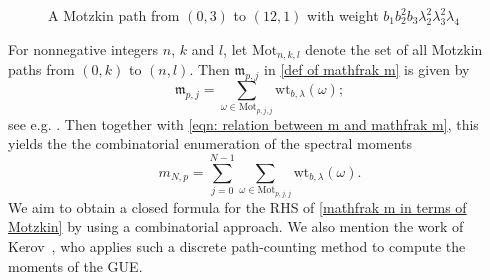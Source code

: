\documentclass{amsart}
\theoremstyle{plain}
\theoremstyle{remark}
\numberwithin{equation}{section}
\begin{document}
\begin{figure}[h]
\centering
{}
\caption{A Motzkin path from $(0,3)$ to $(12,1)$ with weight $b_{1}b_{2}^{2}b_{3}\lambda_{2}^{2}\lambda_{3}^{2}\lambda_{4}$} \label{Fig_Motzkin}
\end{figure}

For nonnegative integers $n$, $k$ and $l$, let $\mathrm{Mot}_{n,k,l}$ denote the set of all Motzkin paths from $(0,k)$ to $(n,l)$. 
Then  $\mathfrak{m}_{p,j}$ in \eqref{def of mathfrak m} is given by  
\begin{equation} \label{mathfrak m in terms of Motzkin}
   \mathfrak{m}_{p,j}=\sum_{\omega\in \mathrm{Mot}_{p,j,j}}\mathrm{wt}_{b,\lambda}(\omega);
\end{equation}
see e.g. \cite[Proposition 3.2]{BFO24}. 
Then together with \eqref{eqn: relation between m and mathfrak m}, this yields the  the combinatorial enumeration of the spectral moments
\begin{equation}\label{Flajolet Viennot}
    m_{N,p}=\sum_{j=0}^{N-1}\sum_{\omega\in \mathrm{Mot}_{p,j,j}}\mathrm{wt}_{b,\lambda}(\omega). 
\end{equation} 
We aim to obtain a closed formula for the RHS of \eqref{mathfrak m in terms of Motzkin} by using a combinatorial approach.
We also mention the work of Kerov~\cite{Ke99}, who applies such a discrete path-counting method to compute the moments of the GUE. 
\end{document}
